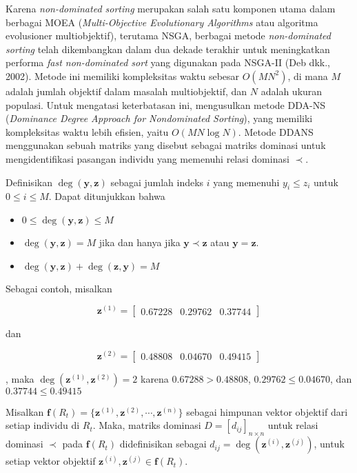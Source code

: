 Karena \textit{non-dominated sorting} merupakan salah satu komponen utama dalam berbagai MOEA (\textit{Multi-Objective Evolutionary Algorithms} atau algoritma evolusioner multiobjektif), terutama NSGA, berbagai metode \textit{non-dominated sorting} telah dikembangkan dalam dua dekade terakhir untuk meningkatkan performa \textit{fast non-dominated sort} yang digunakan pada NSGA-II (Deb dkk., 2002). Metode ini memiliki kompleksitas waktu sebesar $O(MN^2)$, di mana $M$ adalah jumlah objektif dalam masalah multiobjektif, dan $N$ adalah ukuran populasi. Untuk mengatasi keterbatasan ini, \citep{ZhouChenZhang2017} mengusulkan metode DDA-NS (\textit{Dominance Degree Approach for Nondominated Sorting}), yang memiliki kompleksitas waktu lebih efisien, yaitu $O(MN\log N)$. Metode DDANS menggunakan sebuah matriks yang disebut sebagai matriks dominasi untuk mengidentifikasi pasangan individu yang memenuhi relasi dominasi $\prec$. 

Definisikan $\deg(\mathbf{y},\mathbf{z})$ sebagai jumlah indeks $i$ yang memenuhi $y_i \leq z_i$ untuk $0 \leq i\leq M$. Dapat ditunjukkan bahwa

\begin{itemize}
  \item $0 \leq \deg(\mathbf{y},\mathbf{z}) \leq M$ 
  \item $\deg(\mathbf{y},\mathbf{z})=M$ jika dan hanya jika $\mathbf{y} \prec \mathbf{z}$ atau $\mathbf{y} = \mathbf{z}$.
  \item $\deg(\mathbf{y},\mathbf{z})+\deg(\mathbf{z},\mathbf{y})=M$
\end{itemize}

Sebagai contoh, misalkan 

\begin{equation}
  \mathbf{z}^{(1)}=\begin{bmatrix}0.67228 & 0.29762 & 0.37744\end{bmatrix}
\end{equation}

dan 

\begin{equation}
  \mathbf{z}^{(2)}=\begin{bmatrix}0.48808 & 0.04670 & 0.49415\end{bmatrix}
\end{equation}

, maka $\deg(\mathbf{z}^{(1)},\mathbf{z}^{(2)})=2$ karena $0.67288 > 0.48808$, $0.29762 \leq 0.04670$, dan $0.37744 \leq 0.49415$ 

Misalkan $\mathbf{f}(R_t) = \{\mathbf{z}^{(1)}, \mathbf{z}^{(2)}, \cdots, \mathbf{z}^{(n)}\}$ sebagai himpunan vektor objektif dari setiap individu di $R_t$. Maka, matriks dominasi $D = [d_{ij}]_{n \times n}$ untuk relasi dominasi $\prec$ pada $\mathbf{f}(R_t)$ didefinisikan sebagai $d_{ij} = \deg(\mathbf{z}^{(i)},\mathbf{z}^{(j)})$, untuk setiap vektor objektif $\mathbf{z}^{(i)}, \mathbf{z}^{(j)} \in \mathbf{f}(R_t)$.  


